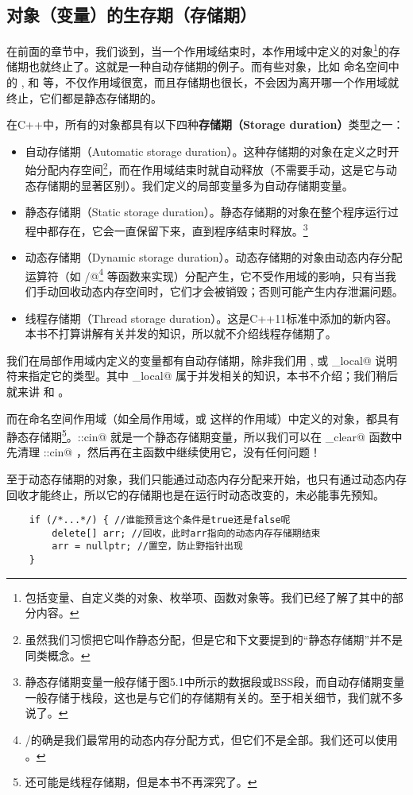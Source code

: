 \subsection*{对象（变量）的生存期（存储期）}
在前面的章节中，我们谈到，当一个作用域结束时，本作用域中定义的对象\footnote{包括变量、自定义类的对象、枚举项、函数对象等。我们已经了解了其中的部分内容。}的存储期也就终止了。这就是一种自动存储期的例子。而有些对象，比如 \lstinline@std@ 命名空间中的 \lstinline@cin@, \lstinline@cout@ 和 \lstinline@endl@ 等，不仅作用域很宽，而且存储期也很长，不会因为离开哪一个作用域就终止，它们都是静态存储期的。\par
在C++中，所有的对象都具有以下四种\textbf{存储期（Storage duration）}类型之一：
\begin{itemize}
    \item 自动存储期（Automatic storage duration）。这种存储期的对象在定义之时开始分配内存空间\footnote{虽然我们习惯把它叫作静态分配，但是它和下文要提到的``静态存储期''并不是同类概念。}，而在作用域结束时就自动释放（不需要手动，这是它与动态存储期的显著区别）。我们定义的局部变量多为自动存储期变量。
    \item 静态存储期（Static storage duration）。静态存储期的对象在整个程序运行过程中都存在，它会一直保留下来，直到程序结束时释放。\footnote{静态存储期变量一般存储于图5.1中所示的数据段或BSS段，而自动存储期变量一般存储于栈段，这也是与它们的存储期有关的。至于相关细节，我们就不多说了。}
    \item 动态存储期（Dynamic storage duration）。动态存储期的对象由动态内存分配运算符（如 \lstinline@new@/\lstinline@new[]@\footnote{\lstinline@new@/\lstinline@delete@ 的确是我们最常用的动态内存分配方式，但它们不是全部。我们还可以使用 \lstinline@malloc@。} 等函数来实现）分配产生，它不受作用域的影响，只有当我们手动回收动态内存空间时，它们才会被销毁；否则可能产生内存泄漏问题。
    \item 线程存储期（Thread storage duration）。这是C++11标准中添加的新内容。本书不打算讲解有关并发的知识，所以就不介绍线程存储期了。
\end{itemize}\par
我们在局部作用域内定义的变量都有自动存储期，除非我们用 \lstinline@static@, \lstinline@extern@ 或 \lstinline@thread_local@ 说明符来指定它的类型。其中 \lstinline@thread_local@ 属于并发相关的知识，本书不介绍；我们稍后就来讲 \lstinline@static@ 和 \lstinline@extern@。\par
而在命名空间作用域（如全局作用域，或 \lstinline@std@ 这样的作用域）中定义的对象，都具有静态存储期\footnote{还可能是线程存储期，但是本书不再深究了。}。\lstinline@std::cin@ 就是一个静态存储期变量，所以我们可以在 \lstinline@input_clear@ 函数中先清理 \lstinline@std::cin@ ，然后再在主函数中继续使用它，没有任何问题！\par
至于动态存储期的对象，我们只能通过动态内存分配来开始，也只有通过动态内存回收才能终止，所以它的存储期也是在运行时动态改变的，未必能事先预知。
\begin{lstlisting}
    if (/*...*/) { //谁能预言这个条件是true还是false呢
        delete[] arr; //回收，此时arr指向的动态内存存储期结束
        arr = nullptr; //置空，防止野指针出现
    }
\end{lstlisting}
